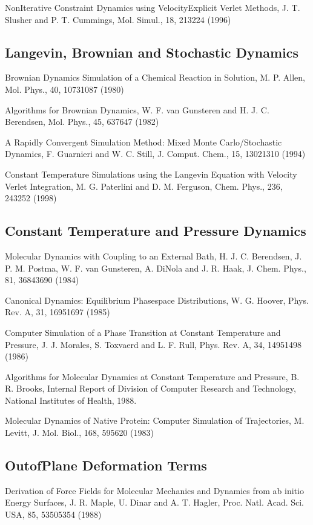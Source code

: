 \documentclass[letterpaper,11pt,english]{sphinxmanual}
\begin{document}
Non\sphinxhyphen{}Iterative Constraint Dynamics using Velocity\sphinxhyphen{}Explicit Verlet Methods, J. T. Slusher and P. T. Cummings, Mol. Simul., 18, 213\sphinxhyphen{}224 (1996)


\subsection{Langevin, Brownian and Stochastic Dynamics}
\label{\detokenize{text/references:langevin-brownian-and-stochastic-dynamics}}
Brownian Dynamics Simulation of a Chemical Reaction in Solution, M. P. Allen, Mol. Phys., 40, 1073\sphinxhyphen{}1087 (1980)

Algorithms for Brownian Dynamics, W. F. van Gunsteren and H. J. C. Berendsen, Mol. Phys., 45, 637\sphinxhyphen{}647 (1982)

A Rapidly Convergent Simulation Method: Mixed Monte Carlo/Stochastic Dynamics, F. Guarnieri and W. C. Still, J. Comput. Chem., 15, 1302\sphinxhyphen{}1310 (1994)

Constant Temperature Simulations using the Langevin Equation with Velocity Verlet Integration, M. G. Paterlini and D. M. Ferguson, Chem. Phys., 236, 243\sphinxhyphen{}252 (1998)


\subsection{Constant Temperature and Pressure Dynamics}
\label{\detokenize{text/references:constant-temperature-and-pressure-dynamics}}
Molecular Dynamics with Coupling to an External Bath, H. J. C. Berendsen, J. P. M. Postma, W. F. van Gunsteren, A. DiNola and J. R. Haak, J. Chem. Phys., 81, 3684\sphinxhyphen{}3690 (1984)

Canonical Dynamics: Equilibrium Phase\sphinxhyphen{}space Distributions, W. G. Hoover, Phys. Rev. A, 31, 1695\sphinxhyphen{}1697 (1985)

Computer Simulation of a Phase Transition at Constant Temperature and Pressure, J. J. Morales, S. Toxvaerd and L. F. Rull, Phys. Rev. A, 34, 1495\sphinxhyphen{}1498 (1986)

Algorithms for Molecular Dynamics at Constant Temperature and Pressure, B. R. Brooks, Internal Report of Division of Computer Research and Technology, National Institutes of Health, 1988.

Molecular Dynamics of Native Protein: Computer Simulation of Trajectories, M. Levitt, J. Mol. Biol., 168, 595\sphinxhyphen{}620 (1983)


\subsection{Out\sphinxhyphen{}of\sphinxhyphen{}Plane Deformation Terms}
\label{\detokenize{text/references:out-of-plane-deformation-terms}}
Derivation of Force Fields for Molecular Mechanics and Dynamics from ab initio Energy Surfaces, J. R. Maple, U. Dinar and A. T. Hagler, Proc. Natl. Acad. Sci. USA, 85, 5350\sphinxhyphen{}5354 (1988)
\end{document}
